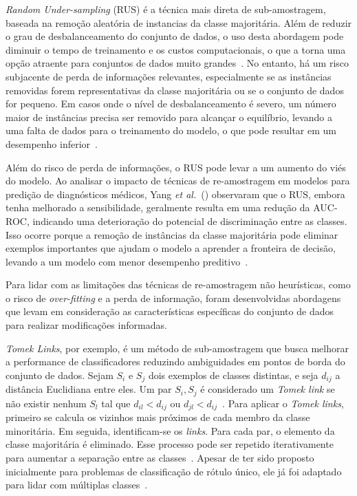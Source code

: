 \textit{Random Under-sampling} (RUS) é a técnica mais direta de sub-amostragem, baseada na remoção aleatória de instancias da classe majoritária. Além de reduzir o grau de desbalanceamento do conjunto de dados, o uso desta abordagem pode diminuir o tempo de treinamento e os custos computacionais, o que a torna uma opção atraente para conjuntos de dados muito grandes~\cite{Fernndez2018}. No entanto, há um risco subjacente de perda de informações relevantes, especialmente se as instâncias removidas forem representativas da classe majoritária ou se o conjunto de dados for pequeno. Em casos onde o nível de desbalanceamento é severo, um número maior de instâncias precisa ser removido para alcançar o equilíbrio, levando a uma falta de dados para o treinamento do modelo, o que pode resultar em um desempenho inferior~\cite{Wasikowski2010}.

Além do risco de perda de informações, o RUS pode levar a um aumento do viés do modelo. Ao analisar o impacto de técnicas de re-amostragem em modelos para predição de diagnósticos médicos, Yang \textit{et al.}~(\citeyear{Yang2024}) observaram que o RUS, embora tenha melhorado a sensibilidade, geralmente resulta em uma redução da AUC-ROC, indicando uma deterioração do potencial de discriminação entre as classes. Isso ocorre porque a remoção de instâncias da classe majoritária pode eliminar exemplos importantes que ajudam o modelo a aprender a fronteira de decisão, levando a um modelo com menor desempenho preditivo~\cite{Wasikowski2010}.

Para lidar com as limitações das técnicas de re-amostragem não heurísticas, como o risco de \textit{over-fitting} e a perda de informação, foram desenvolvidas abordagens que levam em consideração as características específicas do conjunto de dados para realizar modificações informadas.

\textit{Tomek Links}, por exemplo, é um método de sub-amostragem que busca melhorar a performance de classificadores reduzindo ambiguidades em pontos de borda do conjunto de dados. Sejam \(S_{i}\) e \(S_{j}\) dois exemplos de classes distintas, e seja \(d_{ij}\) a distância Euclidiana entre eles. Um par \(S_{i}, S_{j}\) é considerado um \textit{Tomek link} se não existir nenhum \(S_{l}\) tal que \(d_{il} < d_{ij}\) ou \(d_{jl} < d_{ij}\)~\cite{Batista2004}. Para aplicar o \textit{Tomek links}, primeiro se calcula os vizinhos mais próximos de cada membro da classe minoritária. Em seguida, identificam-se os \textit{links}. Para cada par, o elemento da classe majoritária é eliminado. Esse processo pode ser repetido iterativamente para aumentar a separação entre as classes~\cite{Arichandrapandian2024}. Apesar de ter sido proposto inicialmente para problemas de classificação de rótulo único, ele já foi adaptado para lidar com múltiplas classes~\cite{Pereira2020}.

